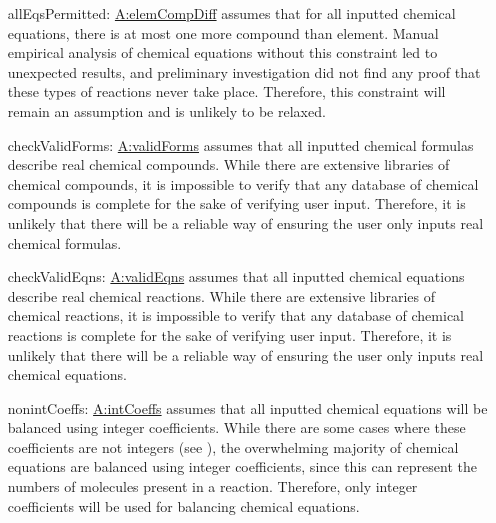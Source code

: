 \documentclass[12pt]{article}
\begin{document}
\begin{itemize}
\item[allEqsPermitted:\phantomsection\label{allEqsPermitted}]{\hyperref[elemCompDiff]{A:elemCompDiff} assumes that for all inputted chemical equations, there is at most one more compound than element.  Manual empirical analysis of chemical equations without this constraint led to unexpected results, and preliminary investigation did not find any proof that these types of reactions never take place. Therefore, this constraint will remain an assumption and is unlikely to be relaxed.}
\item[checkValidForms:\phantomsection\label{checkValidForms}]{\hyperref[validForms]{A:validForms} assumes that all inputted chemical formulas describe real chemical compounds. While there are extensive libraries of chemical compounds, it is impossible to verify that any database of chemical compounds is complete for the sake of verifying user input. Therefore, it is unlikely that there will be a reliable way of ensuring the user only inputs real chemical formulas.}
\item[checkValidEqns:\phantomsection\label{checkValidEqns}]{\hyperref[validEqns]{A:validEqns} assumes that all inputted chemical equations describe real chemical reactions. While there are extensive libraries of chemical reactions, it is impossible to verify that any database of chemical reactions is complete for the sake of verifying user input. Therefore, it is unlikely that there will be a reliable way of ensuring the user only inputs real chemical equations.}
\item[nonintCoeffs:\phantomsection\label{nonintCoeffs}]{\hyperref[intCoeffs]{A:intCoeffs} assumes that all inputted chemical equations will be balanced using integer coefficients. While there are some cases where these coefficients are not integers (see \cite{nonIntCoeffSource}), the overwhelming majority of chemical equations are balanced using integer coefficients, since this can represent the numbers of molecules present in a reaction. Therefore, only integer coefficients will be used for balancing chemical equations.}
\end{itemize}
\end{document}
